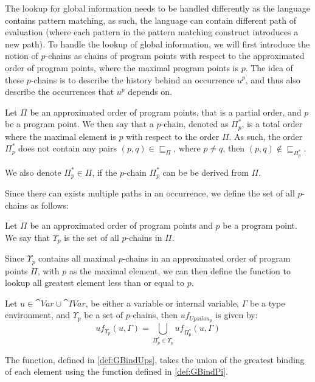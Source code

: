 \documentclass[../../master.tex]{subfiles}
\begin{document}
The lookup for global information needs to be handled differently as the language contains pattern matching, as such, the language can contain different path of evaluation (where each pattern in the pattern matching construct introduces a new path).
To handle the lookup of global information, we will first introduce the notion of $p$-chains as chains of program points with respect to the approximated order of program points, where the maximal program points is $p$.
The idea of these $p$-chains is to describe the history behind an occurrence $u^p$, and thus also describe the occurrences that $u^p$ depends on.

\begin{definition}[$p$-chains]
	Let $\Pi$ be an approximated order of program points, that is a partial order, and $p$ be a program point.
	We then say that a $p$-chain, denoted as $\Pi_p^{*}$, is a total order where the maximal element is $p$ with respect to the order $\Pi$.
	As such, the order $\Pi_p^{*}$ does not contain any pairs $(p,q)\in\sqsubseteq_\Pi$, where $p\neq q$, then $(p,q)\notin\sqsubseteq_{\Pi_p^{*}}$.
\end{definition}

We also denote $\Pi_p^{*}\in\Pi$, if the $p$-chain $\Pi_p^{*}$ can be be derived from $\Pi$.

Since there can exists multiple paths in an occurrence, we define the set of all $p$-chains as follows:

\begin{definition}[]
	Let $\Pi$ be an approximated order of program points and $p$ be a program point.
	We say that $\Upsilon_p$ is the set of all $p$-chains in $\Pi$.
\end{definition}

Since $\Upsilon_p$ contains all maximal $p$-chains in an approximated order of program points $\Pi$, with $p$ as the maximal element, we can then define the function to lookup all greatest element less than or equal to $p$.

\begin{definition}[]\label{def:GBindUps}
	Let $u\in \cat{Var}\cup\cat{IVar}$, be either a variable or internal variable, $\Gamma$ be a type environment, and $\Upsilon_p$ be a set of $p$-chains, then $uf_{Upsilon_p}$ is given by:
	$$uf_{\Upsilon_p}(u,\Gamma)=\bigcup_{\Pi_p^{*}\in\Upsilon_p}uf_{\Pi_p^{*}}(u,\Gamma)$$
\end{definition}

The function, defined in \cref{def:GBindUps}, takes the union of the greatest binding of each element using the function defined in \cref{def:GBindPi}.
\end{document}
